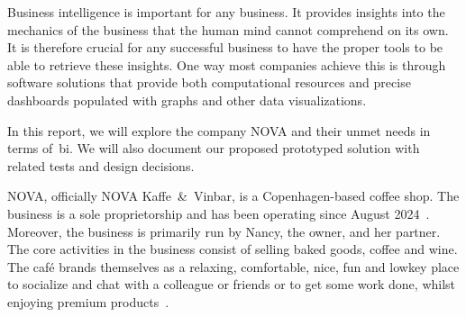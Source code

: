 Business intelligence is important for any business.
It provides insights into the mechanics of the business that the human mind cannot comprehend on its own.
It is therefore crucial for any successful business to have the proper tools to be able to retrieve these insights.
One way most companies achieve this is through software solutions that provide both computational resources and
precise dashboards populated with graphs and other data visualizations.

In this report, we will explore the company NOVA and their unmet needs in terms of~\acrfull{bi}.
We will also document our proposed prototyped solution with related tests and design decisions.

NOVA, officially NOVA Kaffe~\&~Vinbar, is a Copenhagen-based coffee shop.
The business is a sole proprietorship and has been operating since August 2024~\cite{cvr2024}.
Moreover, the business is primarily run by Nancy, the owner, and her partner.
The core activities in the business consist of selling baked goods, coffee and wine.
The café brands themselves as a relaxing, comfortable, nice, fun and lowkey place to socialize and chat with a colleague
or friends or to get some work done, whilst enjoying premium products~\cite{instagram2024}.
